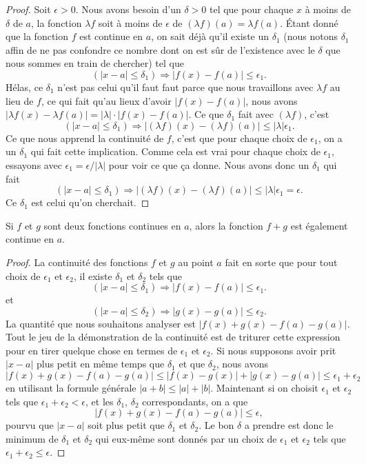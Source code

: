 \documentclass{article}
\begin{document}
\begin{proof}
Soit $\epsilon>0$. Nous avons besoin d'un $\delta>0$ tel que pour chaque $x$ à moins de $\delta$ de $a$, la fonction $\lambda f$ soit à moins de $\epsilon$ de $(\lambda f)(a)=\lambda f(a)$. Étant donné que la fonction $f$ est continue en $a$, on sait déjà qu'il existe un $\delta_1$ (nous notons $\delta_1$ affin de ne pas confondre ce nombre dont on est sûr de l'existence avec le $\delta$ que nous sommes en train de chercher) tel que 
\[ 
  (| x-a |\leq \delta_1)\Rightarrow | f(x)-f(a) |\leq \epsilon_1.
\]
Hélas, ce $\delta_1$ n'est pas celui qu'il faut faut parce que nous travaillons avec $\lambda f$ au lieu de $f$, ce qui fait qu'au lieux d'avoir $| f(x)-f(a) |$, nous avons $| \lambda f(x)-\lambda f(a) |=| \lambda |\cdot | f(x)-f(a) |$.  Ce que $\delta_1$ fait avec $(\lambda f)$, c'est
\[ 
  (| x-a |\leq\delta_1)\Rightarrow  | (\lambda f)(x)- (\lambda f)(a)|\leq | \lambda |\epsilon_1.
\]
Ce que nous apprend la continuité de $f$, c'est que pour chaque choix de $\epsilon_1$, on a un $\delta_1$ qui fait cette implication. Comme cela est vrai pour chaque choix de $\epsilon_1$, essayons avec $\epsilon_1=\epsilon/| \lambda |$ pour voir ce que ça donne. Nous avons donc un $\delta_1$ qui fait
\[ 
  (| x-a |\leq\delta_1)\Rightarrow  | (\lambda f)(x)- (\lambda f)(a)|\leq | \lambda |\epsilon_1=\epsilon.
\]
Ce $\delta_1$ est celui qu'on cherchait. 
\end{proof}

\begin{theorem}
Si $f$ et $g$ sont deux fonctions continues en $a$, alors la fonction $f+g$ est également continue en $a$.
\end{theorem}

\begin{proof}
La continuité des fonctions $f$ et $g$ au point $a$ fait en sorte que pour tout choix de $\epsilon_1$ et $\epsilon_2$, il existe $\delta_1$ et $\delta_2$ tels que 
\[ 
  (| x-a |\leq \delta_1)\Rightarrow | f(x)-f(a) |\leq \epsilon_1.
\]
et
\[ 
  (| x-a |\leq \delta_2)\Rightarrow | g(x)-g(a) |\leq \epsilon_2.
\]
La quantité que nous souhaitons analyser est $| f(x)+g(x)-f(a)-g(a) |$. Tout le jeu de la démonstration de la continuité est de triturer cette expression pour en tirer quelque chose en termes de $\epsilon_1$ et $\epsilon_2$. Si nous supposons avoir prit $| x-a |$ plus petit en même temps que $\delta_1$ et que $\delta_2$, nous avons
\[
| f(x)+g(x)-f(a)-g(a) |\leq| f(x)-g(x) |+| g(x)-g(a) |\leq\epsilon_1+\epsilon_2 
\]
en utilisant la formule générale $| a+b |\leq | a |+| b |$. Maintenant si on choisit $\epsilon_1$ et $\epsilon_2$ tels que $\epsilon_1+\epsilon_2<\epsilon$, et les $\delta_1$, $\delta_2$ correspondants, on a que 
\[
| f(x)+g(x)-f(a)-g(a) |\leq\epsilon,
\]
pourvu que $| x-a |$ soit plus petit que $\delta_1$ et $\delta_2$. Le bon $\delta$ a prendre est donc le minimum de $\delta_1$ et $\delta_2$ qui eux-même sont donnés par un choix de $\epsilon_1$ et $\epsilon_2$ tels que $\epsilon_1+\epsilon_2\leq\epsilon$.
\end{proof}
\end{document}
